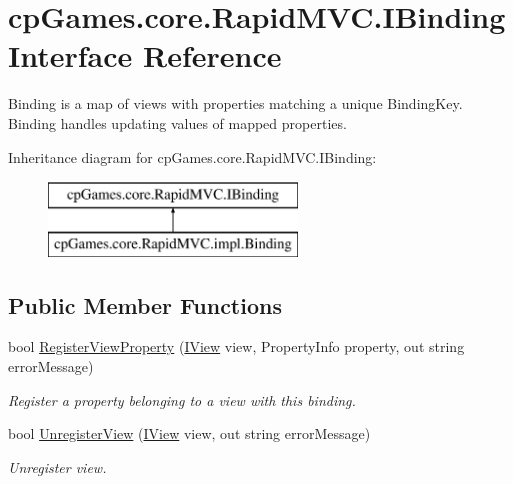 \hypertarget{interfacecp_games_1_1core_1_1_rapid_m_v_c_1_1_i_binding}{}\section{cp\+Games.\+core.\+Rapid\+M\+V\+C.\+I\+Binding Interface Reference}
\label{interfacecp_games_1_1core_1_1_rapid_m_v_c_1_1_i_binding}


Binding is a map of views with properties matching a unique Binding\+Key. Binding handles updating values of mapped properties.  


Inheritance diagram for cp\+Games.\+core.\+Rapid\+M\+V\+C.\+I\+Binding\+:\begin{figure}[H]
\begin{center}
\leavevmode
\includegraphics[height=2.000000cm]{interfacecp_games_1_1core_1_1_rapid_m_v_c_1_1_i_binding}
\end{center}
\end{figure}
\subsection*{Public Member Functions}
\begin{DoxyCompactItemize}
\item 
bool \mbox{\hyperlink{interfacecp_games_1_1core_1_1_rapid_m_v_c_1_1_i_binding_a600504a6b8ba86a81e02ef03c4dc9e53}{Register\+View\+Property}} (\mbox{\hyperlink{interfacecp_games_1_1core_1_1_rapid_m_v_c_1_1_i_view}{I\+View}} view, Property\+Info property, out string error\+Message)
\begin{DoxyCompactList}\small\item\em Register a property belonging to a view with this binding. \end{DoxyCompactList}\item 
bool \mbox{\hyperlink{interfacecp_games_1_1core_1_1_rapid_m_v_c_1_1_i_binding_ab36c868f3a9163935a650c30663f7a97}{Unregister\+View}} (\mbox{\hyperlink{interfacecp_games_1_1core_1_1_rapid_m_v_c_1_1_i_view}{I\+View}} view, out string error\+Message)
\begin{DoxyCompactList}\small\item\em Unregister view. \end{DoxyCompactList}\end{DoxyCompactItemize}
